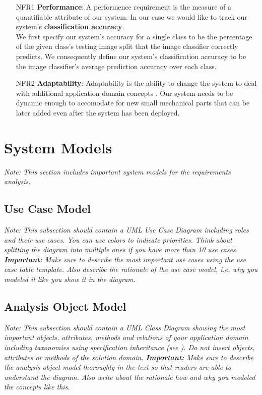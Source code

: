 \documentclass[a4paper,12pt,twoside]{report}
\begin{document}
\begin{itemize}
\item [NFR1] \textbf{Performance}: A performence requirement is the measure of a quantifiable attribute of our system. In our case we would like to track our system's \textbf{classification accuracy}.\\
We first specify our system's accuracy for a single class to be the percentage of the given class's testing image split that the image classifier correctly predicts. We consequently define our system's classification accuracy to be the image classifier's average prediction accuracy over each class.

\item [NFR2] \textbf{Adaptability}: Adaptability is the ability to change the system to deal with additional application domain concepts \cite{bruegge2004object}. Our system needs to be dynamic enough to accomodate for new small mechanical parts that can be later added even after the system has been deployed.
\end{itemize}

\section{System Models}

\textit{Note: This section includes important system models for the requirements analysis.}

\subsection{Use Case Model}

\textit{Note: This subsection should contain a UML Use Case Diagram including roles and their use cases. You can use colors to indicate priorities. Think about splitting the diagram into multiple ones if you have more than 10 use cases.
\textbf{Important:} Make sure to describe the most important use cases using the use case table template. Also describe the rationale of the use case model, i.e. why you modeled it like you show it in the diagram.}

\subsection{Analysis Object Model}

\textit{Note: This subsection should contain a UML Class Diagram showing the most important objects, attributes, methods and relations of your application domain including taxonomies using specification inheritance (see \cite{bruegge2004object}). Do not insert objects, attributes or methods of the solution domain.
\textbf{Important:} Make sure to describe the analysis object model thoroughly in the text so that readers are able to understand the diagram. Also write about the rationale how and why you modeled the concepts like this.}
\end{document}
